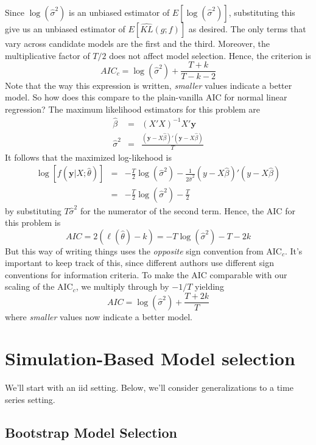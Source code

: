 \documentclass[12pt]{article}
\theoremstyle{definition}
\begin{document}
Since $\log(\widehat{\sigma}^2)$ is an unbiased estimator of $E[\log(\widehat{\sigma}^2)]$, substituting this give us an unbiased estimator of $E\left[\widehat{KL}(g;f) \right]$ as desired.
The only terms that vary across candidate models are the first and the third. Moreover, the multiplicative factor of $T/2$ does not affect model selection. Hence, the criterion is
$$AIC_c = \log(\widehat{\sigma}^2) + \frac{T + k}{T - k -2}$$
Note that the way this expression is written, \emph{smaller} values indicate a better model. So how does this compare to the plain-vanilla AIC for normal linear regression? The maximum likelihood estimators for this problem are
\begin{eqnarray*}
\widehat{\beta} &=& (X'X)^{-1}X'\mathbf{y}\\
\widehat{\sigma}^2 &=& \frac{(\mathbf{y} - X\widehat{\beta})'(\mathbf{y} - X\widehat{\beta})}{T}
\end{eqnarray*}
It follows that the maximized log-likehood is
\begin{eqnarray*}
\log\left[f(\mathbf{y}|X;\widehat{\theta})\right] &=& -\frac{T}{2} \log(\widehat{\sigma}^2) - \frac{1}{2\widehat{\sigma}^2}(y - X\widehat{\beta})'(y -X\widehat{\beta})\\
&=& -\frac{T}{2} \log(\widehat{\sigma}^2) - \frac{T}{2}
\end{eqnarray*}
by substituting $T\widehat{\sigma}^2$ for the numerator of the second term. Hence, the AIC for this problem is
$$AIC = 2\left(\ell(\widehat{\theta}) - k \right) = -T\log(\widehat{\sigma}^2) - T - 2k $$
But this way of writing things uses the \emph{opposite} sign convention from AIC$_c$. It's important to keep track of this, since different authors use different sign conventions for information criteria. To make the AIC comparable with our scaling of the AIC$_c$, we multiply through by $-1/T$ yielding
$$AIC = \log(\widehat{\sigma}^2) + \frac{T + 2k}{T}$$
where \emph{smaller} values now indicate a better model.



\section{Simulation-Based Model selection}
We'll start with an iid setting. Below, we'll consider generalizations to a time series setting.

\subsection{Bootstrap Model Selection}
\end{document}
